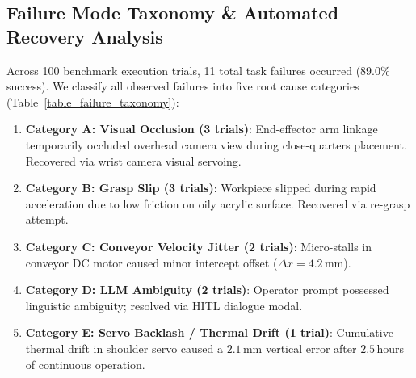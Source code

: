 \documentclass[journal]{IEEEtran}
\begin{document}
\begin{table}[!t]
\centering
\caption{Computational Latency and VRAM Profiling Breakdown Across ARIA Subsystems}
\label{table_vram_profiling}
\footnotesize
{}
\end{table}

\subsection{Failure Mode Taxonomy \& Automated Recovery Analysis}
Across 100 benchmark execution trials, 11 total task failures occurred ($89.0\%$ success). We classify all observed failures into five root cause categories (Table~\ref{table_failure_taxonomy}):
\begin{enumerate}
    \item \textbf{Category A: Visual Occlusion (3 trials)}: End-effector arm linkage temporarily occluded overhead camera view during close-quarters placement. Recovered via wrist camera visual servoing.
    \item \textbf{Category B: Grasp Slip (3 trials)}: Workpiece slipped during rapid acceleration due to low friction on oily acrylic surface. Recovered via re-grasp attempt.
    \item \textbf{Category C: Conveyor Velocity Jitter (2 trials)}: Micro-stalls in conveyor DC motor caused minor intercept offset ($\Delta x = 4.2$\,mm).
    \item \textbf{Category D: LLM Ambiguity (2 trials)}: Operator prompt possessed linguistic ambiguity; resolved via HITL dialogue modal.
    \item \textbf{Category E: Servo Backlash / Thermal Drift (1 trial)}: Cumulative thermal drift in shoulder servo caused a $2.1$\,mm vertical error after $2.5$\,hours of continuous operation.
\end{enumerate}
\end{document}
